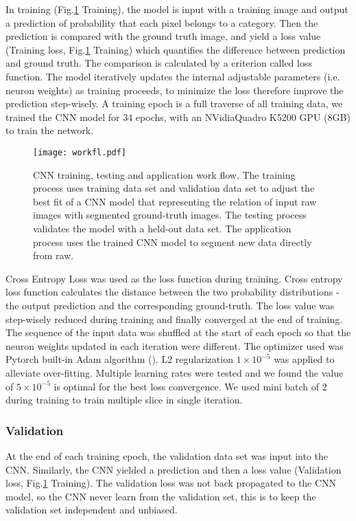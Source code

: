 \documentclass[draft,linenumbers]{agujournal2018}
\begin{document}
In training (Fig.\ref{workfl} Training), the model is input with a training image and output a prediction of probability that each pixel belongs to a category. Then the prediction is compared with the ground truth image, and yield a loss value (Training loss, Fig.\ref{workfl} Training) which quantifies the difference between prediction and ground truth. The comparison is calculated by a criterion called loss function. The model iteratively updates the internal adjustable parameters (i.e. neuron weights) as training proceeds, to minimize the loss therefore improve the prediction step-wisely. A training epoch is a full traverse of all training data, we trained the CNN model for 34 epochs, with an NVidia\texttrademark Quadro K5200 GPU (8GB) to train the network. 

\begin{figure}[h]
\centering
\texttt{[image: workfl.pdf]}
\caption{CNN training, testing and application work flow. The training process uses training data set and validation data set to adjust the best fit of a CNN model that representing the relation of input raw images with segmented ground-truth images. The testing process validates the model with a held-out data set. The application process uses the trained CNN model to segment new data directly from raw.}
\label{workfl}
\end{figure}

Cross Entropy Loss was used as the loss function during training. Cross entropy loss function calculates the distance between the two probability distributions - the output prediction and the corresponding ground-truth. The loss value was step-wisely reduced during training and finally converged at the end of training. 
The sequence of the input data was shuffled at the start of each epoch so that the neuron weights updated in each iteration were different. The optimizer used was Pytorch built-in Adam algorithm (\citet{kingma2014adam}). L2 regularization $1\times10^{-5}$ was applied to alleviate over-fitting. Multiple learning rates were tested and we found the value of $5\times10^{-5}$ is optimal for the best loss convergence. We used mini batch of 2 during training to train multiple slice in single iteration.

\subsubsection{Validation}
At the end of each training epoch, the validation data set was input into the CNN. Similarly, the CNN yielded a prediction and then a loss value (Validation loss, Fig.\ref{workfl} Training). The validation loss was not back propagated to the CNN model, so the CNN never learn from the validation set, this is to keep the validation set independent and unbiased.
\end{document}

